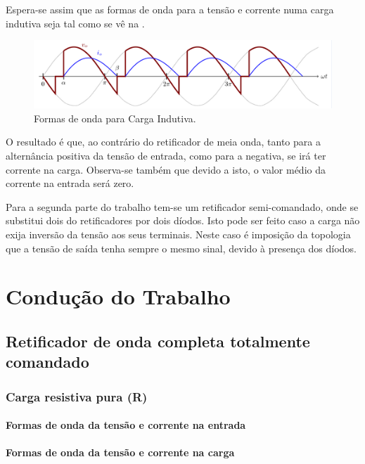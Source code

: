\documentclass[a4paper,11pt]{article}
\numberwithin{equation}{section}
\begin{document}
Espera-se assim que as formas de onda para a tensão e corrente numa carga indutiva seja tal como se vê na .

\begin{figure}[h]
	\centering
	\includegraphics[keepaspectratio=true, scale=0.8]{img/andamento.png}
	\caption{Formas de onda para Carga Indutiva.}
	\label{fig:andamento}
	\vspace{-0.8em}
\end{figure}

O resultado é que, ao contrário do retificador de meia onda, tanto para a alternância positiva da tensão de entrada, como para a negativa, se irá ter corrente na carga. Observa-se também que devido a isto, o valor médio da corrente na entrada será zero.

Para a segunda parte do trabalho tem-se um retificador semi-comandado, onde se substitui dois do retificadores por dois díodos. Isto pode ser feito caso a carga não exija inversão da tensão aos seus terminais. Neste caso é imposição da topologia que a tensão de saída tenha sempre o mesmo sinal, devido à presença dos díodos.


\section{Condução do Trabalho}

\subsection{Retificador de onda completa totalmente comandado}

\subsubsection{Carga resistiva pura (R)}

\paragraph{Formas de onda da tensão e corrente na entrada}

\paragraph{Formas de onda da tensão e corrente na carga}
\end{document}
